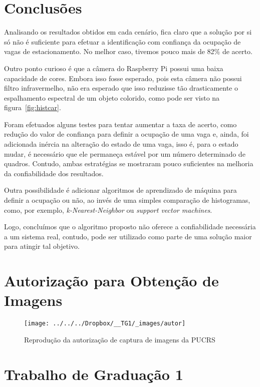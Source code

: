 \documentclass[ecp,tc]{iiufrgs}
\begin{document}
\chapter{Conclusões}

Analisando os resultados obtidos em cada cenário, fica claro que a solução por si só não é suficiente para efetuar a identificação com confiança da ocupação de vagas de estacionamento. No melhor caso, tivemos pouco mais de 82\% de acerto.

Outro ponto curioso é que a câmera do Raspberry Pi possui uma baixa capacidade de cores. Embora isso fosse esperado, pois esta câmera não possui filtro infravermelho, não era esperado que isso reduzisse tão drasticamente o espalhamento espectral de um objeto colorido, como pode ser visto na figura~\ref{fig:histcar}.

Foram efetuados alguns testes para tentar aumentar a taxa de acerto, como redução do valor de confiança para definir a ocupação de uma vaga e, ainda, foi adicionada inércia na alteração do estado de uma vaga, isso é, para o estado mudar, é necessário que ele permaneça estável por um número determinado de quadros. Contudo, ambas estratégias se mostraram pouco suficientes na melhoria da confiabilidade dos resultados.

Outra possibilidade é adicionar algoritmos de aprendizado de máquina para definir a ocupação ou não, ao invés de uma simples comparação de histogramas, como, por exemplo, \textit{k-Nearest-Neighbor} ou \textit{support vector machines}.

Logo, concluímos que o algoritmo proposto não oferece a confiabilidade necessária a um sistema real, contudo, pode ser utilizado como parte de uma solução maior para atingir tal objetivo.


\nocite{Sobral2014}
\nocite{6264659}
\nocite{KaewTraKulPong2002}
\nocite{BinZabawi2013}
\nocite{Lin2006}
\nocite{Brainard2003}




\annex
\chapter{Autorização para Obtenção de Imagens}
\label{autoriz}
\begin{figure}[h]
	\caption{Reprodução da autorização de captura de imagens da PUCRS}
	\centering
	\texttt{[image: ../../../Dropbox/\_\_TG1/\_images/autor]}
	\label{fig:autor}
\end{figure}


\chapter{Trabalho de Graduação 1}
\label{tg1}
\end{document}
